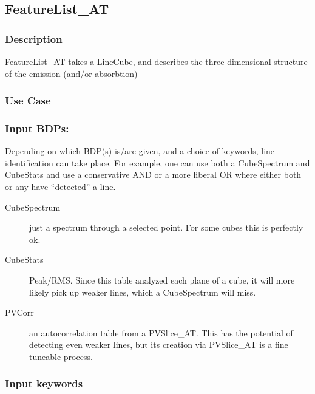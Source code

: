 
\subsection{FeatureList\_AT}

\subsubsection{Description}

FeatureList\_AT takes a LineCube, and describes the three-dimensional structure
of the emission (and/or absorbtion)


\subsubsection{Use Case}

\subsubsection{Input BDPs:}

Depending on which BDP(s) is/are given, and a choice of keywords, line
identification can take place.  For example, one can use both a
CubeSpectrum and CubeStats and use a conservative AND or a more
liberal OR where either both or any have ``detected'' a line.

\begin{description}
\item[CubeSpectrum] just a spectrum through a selected point. For some cubes this is perfectly ok.
\item[CubeStats] Peak/RMS. Since this table analyzed each plane of a cube, it will more likely pick 
up weaker lines, which a CubeSpectrum will miss.
\item[PVCorr] an autocorrelation table from a PVSlice\_AT. This has the potential of detecting even
weaker lines, but its creation via PVSlice\_AT is a fine tuneable process.
\end{description}


\subsubsection{Input keywords}

